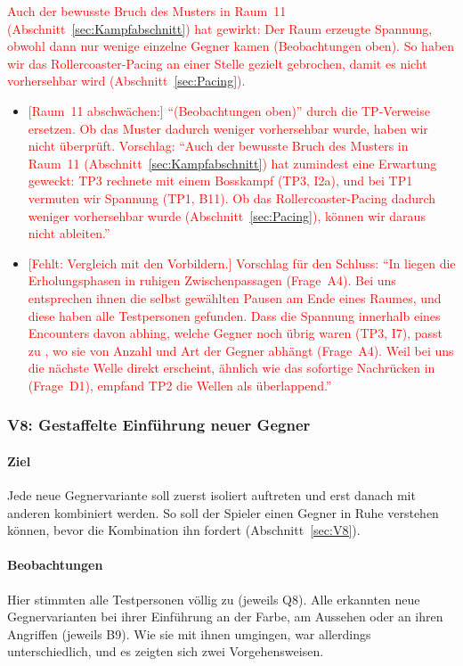 \documentclass[../Main.tex]{subfiles}
\begin{document}
\textcolor{red}{Auch der bewusste Bruch des Musters in Raum~11 (Abschnitt~\ref{sec:Kampfabschnitt}) hat gewirkt: Der Raum erzeugte Spannung, obwohl dann nur wenige einzelne Gegner kamen (Beobachtungen oben). So haben wir das Rollercoaster-Pacing an einer Stelle gezielt gebrochen, damit es nicht vorhersehbar wird (Abschnitt~\ref{sec:Pacing}).}

\begin{itemize}[leftmargin=1.5cm]
    \item \textcolor{red}{[Raum~11 abschwächen:] \enquote{(Beobachtungen oben)} durch die TP-Verweise ersetzen. Ob das Muster dadurch weniger vorhersehbar wurde, haben wir nicht überprüft. Vorschlag: \enquote{Auch der bewusste Bruch des Musters in Raum~11 (Abschnitt~\ref{sec:Kampfabschnitt}) hat zumindest eine Erwartung geweckt: TP3 rechnete mit einem Bosskampf (TP3, I2a), und bei TP1 vermuten wir Spannung (TP1, B11). Ob das Rollercoaster-Pacing dadurch weniger vorhersehbar wurde (Abschnitt~\ref{sec:Pacing}), können wir daraus nicht ableiten.}}
    \item \textcolor{red}{[Fehlt: Vergleich mit den Vorbildern.] Vorschlag für den Schluss: \enquote{In  liegen die Erholungsphasen in ruhigen Zwischenpassagen (Frage~A4). Bei uns entsprechen ihnen die selbst gewählten Pausen am Ende eines Raumes, und diese haben alle Testpersonen gefunden. Dass die Spannung innerhalb eines Encounters davon abhing, welche Gegner noch übrig waren (TP3, I7), passt zu , wo sie von Anzahl und Art der Gegner abhängt (Frage~A4). Weil bei uns die nächste Welle direkt erscheint, ähnlich wie das sofortige Nachrücken in  (Frage~D1), empfand TP2 die Wellen als überlappend.}}
\end{itemize}

\subsubsection{V8: Gestaffelte Einführung neuer Gegner}

\paragraph{Ziel}
Jede neue Gegnervariante soll zuerst isoliert auftreten und erst danach mit anderen kombiniert werden. So soll der Spieler einen Gegner in Ruhe verstehen können, bevor die Kombination ihn fordert (Abschnitt~\ref{sec:V8}).

\paragraph{Beobachtungen}
Hier stimmten alle Testpersonen völlig zu (jeweils Q8). Alle erkannten neue Gegnervarianten bei ihrer Einführung an der Farbe, am Aussehen oder an ihren Angriffen (jeweils B9). Wie sie mit ihnen umgingen, war allerdings unterschiedlich, und es zeigten sich zwei Vorgehensweisen.
\end{document}
